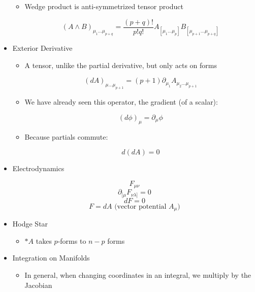 \begin{itemize}
\begin{itemize}
\begin{itemize}
        \end{itemize}

      \item Wedge product is anti-symmetrized tensor product

        $$(A\wedge B)_{\mu_1\ldots\mu_{p+q}}=\frac{(p+q)!}{p!q!}A_{[\mu_1\ldots\mu_p]}B_{[\mu_{p+1}\ldots\mu_{p+q}]}$$

    \end{itemize}

  \item Exterior Derivative

    \begin{itemize}

      \item A tensor, unlike the partial derivative, but only acts on forms

        $$(dA)_{\mu\ldots\mu_{p+1}}=(p+1)\partial_{\mu_1}A_{\mu_2\ldots\mu_{p+1}}$$

      \item We have already seen this operator, the gradient (of a scalar):

        $$(d\phi)_{\mu}=\partial_{\mu}\phi$$

      \item Because partials commute:

        $$d(dA)=0$$

    \end{itemize}

  \item Electrodynamics

    $$F_{\mu\nu}$$
    $$\partial_{[\mu}F_{\nu\lambda]}=0$$
    $$dF=0$$
    $$F=dA\text{ (vector potential }A_{\mu})$$

  \item Hodge Star

    \begin{itemize}

      \item $*A$ takes $p$-forms to $n-p$ forms

    \end{itemize}

  \item Integration on Manifolds

    \begin{itemize}

      \item In general, when changing coordinates in an integral, we multiply by the Jacobian


\end{itemize}
\end{itemize}
